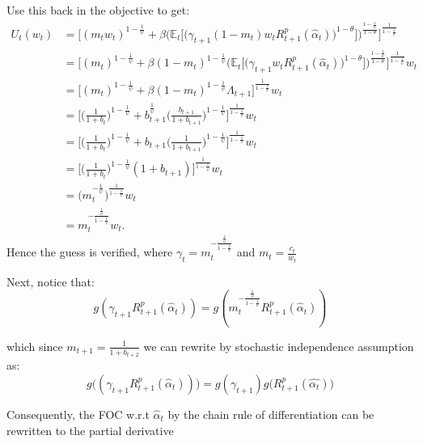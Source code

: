 \documentclass[12pt,a4paper]{article}
\begin{document}
Use this back in the objective to get: 
\begin{align*}
     U_t(w_t) &= \bigg[ (m_tw_t)^{1-\frac{1}{\psi}}+\beta\bigg(\mathbb{E}_t\bigg[\big(\gamma_{t+1}(1-m_t)w_tR^{p}_{t+1}(\hat{\alpha}_t)\big)^{1-\theta}\bigg]\bigg)^\frac{1-\frac{1}{\psi}}{1-\theta}\bigg]^\frac{1}{1-\frac{1}{\psi}}\\
     &= \bigg[ (m_t)^{1-\frac{1}{\psi}}+\beta(1-m_t)^{1-\frac{1}{\psi}}\bigg(\mathbb{E}_t\bigg[\big(\gamma_{t+1}w_tR^{p}_{t+1}(\hat{\alpha}_t)\big)^{1-\theta}\bigg]\bigg)^\frac{1-\frac{1}{\psi}}{1-\theta}\bigg]^\frac{1}{1-\frac{1}{\psi}}w_t\\
     &=\bigg[ (m_t)^{1-\frac{1}{\psi}}+\beta(1-m_t)^{1-\frac{1}{\psi}}\Lambda_{t+1}\bigg]^\frac{1}{1-\frac{1}{\psi}}w_t\\
     &=\bigg[ \bigg(\frac{1}{1+b_t}\bigg)^{1-\frac{1}{\psi}}+b_{t+1}^{\frac{1}{\psi}}\bigg(\frac{b_{t+1}}{1+b_{t+1}}\bigg)^{1-\frac{1}{\psi}}\bigg]^\frac{1}{1-\frac{1}{\psi}}w_t\\
     &=\bigg[ \bigg(\frac{1}{1+b_t}\bigg)^{1-\frac{1}{\psi}}+b_{t+1}\bigg(\frac{1}{1+b_{t+1}}\bigg)^{1-\frac{1}{\psi}}\bigg]^\frac{1}{1-\frac{1}{\psi}}w_t\\
     &=\bigg[ \bigg(\frac{1}{1+b_t}\bigg)^{1-\frac{1}{\psi}}(1+b_{t+1})\bigg]^\frac{1}{1-\frac{1}{\psi}}w_t\\
     &=\bigg(m_t^{-\frac{1}{\psi}}\bigg)^{\frac{1}{1-\frac{1}{\psi}}}w_t\\
     &= m_t^{-\frac{\frac{1}{\psi}}{1-\frac{1}{\psi}}}w_t.
\end{align*}
Hence the guess is verified, where $\gamma_t=m_t^{-\frac{\frac{1}{\psi}}{1-\frac{1}{\psi}}}$ and $m_t=\frac{c_t}{w_t}$

 Next, notice that: 
\begin{equation*}
    g(\gamma_{t+1}R^{p}_{t+1}(\hat{\alpha}_t))=g(m_t^{-\frac{\frac{1}{\psi}}{1-\frac{1}{\psi}}}R^{p}_{t+1}(\hat{\alpha}_t))
\end{equation*}

which since $m_{t+1}=\frac{1}{1+b_{t+2}}$ we can rewrite by stochastic independence assumption as:
\begin{equation*}
     g\big((\gamma_{t+1}R^{p}_{t+1}(\hat{\alpha}_t))\big)=g(\gamma_{t+1})g\big(R^{p}_{t+1}(\hat{\alpha_t})\big)
\end{equation*} 

Consequently, the FOC w.r.t $\hat{\alpha}_t$ by the chain rule of differentiation can be rewritten to the partial derivative
\end{document}
